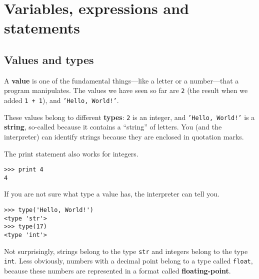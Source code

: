 

\chapter{Variables, expressions and statements}

\section{Values and types}

A {\bf value} is one of the fundamental things---like a letter or a
number---that a program manipulates.  The values we have seen so far
are {\tt 2} (the result when we added {\tt 1 + 1}), and
{\tt 'Hello, World!'}.

These values belong to different {\bf types}:
{\tt 2} is an integer, and {\tt 'Hello, World!'} is a {\bf string},
so-called because it contains a ``string'' of letters.
You (and the interpreter) can identify
strings because they are enclosed in quotation marks.

The print statement also works for integers.

\beforeverb
\begin{verbatim}
>>> print 4
4
\end{verbatim}
\afterverb
%
If you are not sure what type a value has,
the interpreter can tell you.

\beforeverb
\begin{verbatim}
>>> type('Hello, World!')
<type 'str'>
>>> type(17)
<type 'int'>
\end{verbatim}
\afterverb
%
Not surprisingly, strings belong to the type {\tt str} and
integers belong to the type {\tt int}.  Less obviously, numbers
with a decimal point belong to a type called {\tt float},
because these numbers are represented in a
format called {\bf floating-point}.

